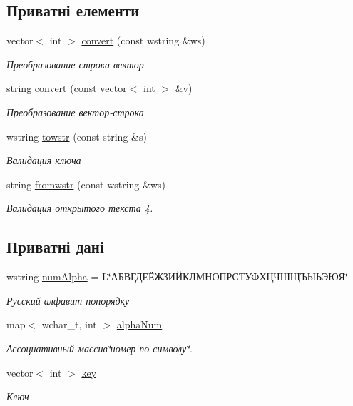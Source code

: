 \subsection*{Приватні елементи}
\begin{DoxyCompactItemize}
\item 
vector$<$ int $>$ \hyperlink{classmodAlphaCipher_ad08ba0004ee53526e9110ff20daffb90}{convert} (const wstring \&ws)
\begin{DoxyCompactList}\small\item\em Преобразование строка-\/вектор \end{DoxyCompactList}\item 
string \hyperlink{classmodAlphaCipher_a0c204ef4200fbdd11e2e7f8a3018b396}{convert} (const vector$<$ int $>$ \&v)
\begin{DoxyCompactList}\small\item\em Преобразование вектор-\/строка \end{DoxyCompactList}\item 
wstring \hyperlink{classmodAlphaCipher_abe2b4d4ac6d40a1e1fec64953f047594}{towstr} (const string \&s)
\begin{DoxyCompactList}\small\item\em Валидация ключа \end{DoxyCompactList}\item 
string \hyperlink{classmodAlphaCipher_ac5726e023a298cccbdd65ceb4f0e705f}{fromwstr} (const wstring \&ws)
\begin{DoxyCompactList}\small\item\em Валидация открытого текста 4. \end{DoxyCompactList}\end{DoxyCompactItemize}
\subsection*{Приватні дані}
\begin{DoxyCompactItemize}
\item 
wstring \hyperlink{classmodAlphaCipher_a9f83731ae4d58df14e1df3bd089d7501}{num\+Alpha} = L\char`\"{}АБВГДЕЁЖЗИЙКЛМНОПРСТУФХЦЧШЩЪЫЬЭЮЯ\char`\"{}
\begin{DoxyCompactList}\small\item\em Русский алфавит попорядку \end{DoxyCompactList}\item 
map$<$ wchar\+\_\+t, int $>$ \hyperlink{classmodAlphaCipher_a9f0ca70558be9e08474f544aeaac55d8}{alpha\+Num}
\begin{DoxyCompactList}\small\item\em Ассоциативный массив\char`\"{}номер по символу\char`\"{}. \end{DoxyCompactList}\item 
vector$<$ int $>$ \hyperlink{classmodAlphaCipher_a318efb0cdcd8bc0c084097e175c2006b}{key}
\begin{DoxyCompactList}\small\item\em Ключ \end{DoxyCompactList}\end{DoxyCompactItemize}


